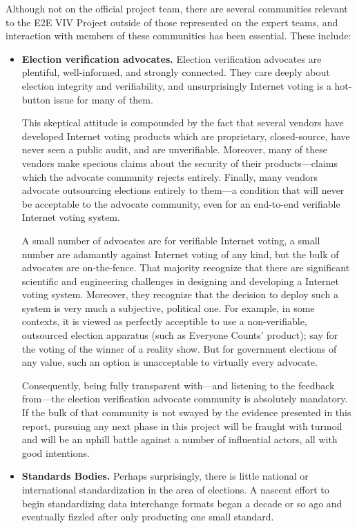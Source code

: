 Although not on the official project team, there are several
communities relevant to the E2E VIV Project outside of those
represented on the expert teams, and interaction with members of these
communities has been essential. These include:
\begin{itemize}
\item \textbf{Election verification advocates.} Election verification
  advocates are plentiful, well-informed, and strongly connected.
  They care deeply about election integrity and verifiability, and
  unsurprisingly Internet voting is a hot-button issue for many of
  them.

  This skeptical attitude is compounded by the fact that several
  vendors have developed Internet voting products which are
  proprietary, closed-source, have never seen a public audit, and are
  unverifiable. Moreover, many of these vendors make specious claims
  about the security of their products---claims which the advocate
  community rejects entirely. Finally, many vendors advocate
  outsourcing elections entirely to them---a condition that will never
  be acceptable to the advocate community, even for an end-to-end
  verifiable Internet voting system.

  A small number of advocates are for verifiable Internet voting, a
  small number are adamantly against Internet voting of any kind, but
  the bulk of advocates are on-the-fence. That majority recognize
  that there are significant scientific and engineering challenges in
  designing and developing a Internet voting system. Moreover, they
  recognize that the decision to deploy such a system is very much a
  subjective, political one. For example, in some contexts, it is
  viewed as perfectly acceptible to use a non-verifiable, outsourced
  election apparatus (such as Everyone Counts' product); say for the
  voting of the winner of a reality show. But for government
  elections of any value, such an option is unacceptable to virtually
  every advocate.

  Consequently, being fully transparent with---and listening to the
  feedback from---the election verification advocate community is
  absolutely mandatory. If the bulk of that community is not swayed
  by the evidence presented in this report, pursuing any next phase in
  this project will be fraught with turmoil and will be an uphill
  battle against a number of influential actors, all with good
  intentions.

\item \textbf{Standards Bodies.} Perhaps surprisingly, there is little
  national or international standardization in the area of elections.
  A nascent effort to begin standardizing data interchange formats
  began a decade or so ago and eventually fizzled after only
  producting one small standard.


\end{itemize}
